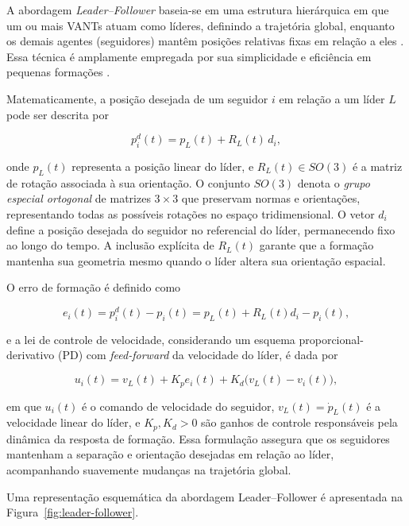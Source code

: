 A abordagem \textit{Leader–Follower} baseia-se em uma estrutura hierárquica em que um ou mais VANTs atuam como líderes, definindo a trajetória global, enquanto os demais agentes (seguidores) mantêm posições relativas fixas em relação a eles \citep{liu2024leaderfollower}. Essa técnica é amplamente empregada por sua simplicidade e eficiência em pequenas formações \citep{bu2024advancement}.

Matematicamente, a posição desejada de um seguidor $i$ em relação a um líder $L$ pode ser descrita por

\begin{equation}
\label{eq:lf_desired_position}
p_i^{d}(t) = p_L(t) + R_L(t) \, d_i,
\end{equation}

onde $p_L(t)$ representa a posição linear do líder, e $R_L(t) \in SO(3)$ é a matriz de rotação associada à sua orientação. O conjunto $SO(3)$ denota o \textit{grupo especial ortogonal} de matrizes $3 \times 3$ que preservam normas e orientações, representando todas as possíveis rotações no espaço tridimensional. O vetor $d_i$ define a posição desejada do seguidor no referencial do líder, permanecendo fixo ao longo do tempo. A inclusão explícita de $R_L(t)$ garante que a formação mantenha sua geometria mesmo quando o líder altera sua orientação espacial.

O erro de formação é definido como

\begin{equation}
\label{eq:lf_error}
e_i(t) = p_i^{d}(t) - p_i(t) = p_L(t) + R_L(t)d_i - p_i(t),
\end{equation}

e a lei de controle de velocidade, considerando um esquema proporcional-derivativo (PD) com \textit{feed-forward} da velocidade do líder, é dada por

\begin{equation}
\label{eq:lf_control_law}
u_i(t) = v_L(t) + K_p e_i(t) + K_d \big(v_L(t) - v_i(t)\big),
\end{equation}

em que $u_i(t)$ é o comando de velocidade do seguidor, $v_L(t) = \dot{p}_L(t)$ é a velocidade linear do líder, e $K_p, K_d > 0$ são ganhos de controle responsáveis pela dinâmica da resposta de formação. Essa formulação assegura que os seguidores mantenham a separação e orientação desejadas em relação ao líder, acompanhando suavemente mudanças na trajetória global.

Uma representação esquemática da abordagem Leader–Follower é apresentada na Figura~\ref{fig:leader-follower}.

